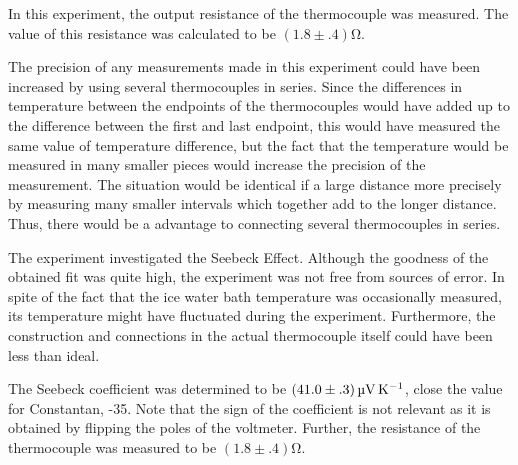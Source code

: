 \begin{paper}
	\columnbreak
	
	In this experiment, the output resistance of the thermocouple was measured.
	The value of this resistance was calculated to be $(1.8\pm.4)\si{\ohm}$.

	The precision of any measurements made in this experiment could have been increased by using several thermocouples in series.
	Since the differences in temperature between the endpoints of the thermocouples would have added up to the difference between the first and last endpoint, this would have measured the same value of temperature difference, but the fact that the temperature would be measured in many smaller pieces would increase the precision of the measurement.
	The situation would be identical if a large distance more precisely by measuring many smaller intervals which together add to the longer distance.
	Thus, there would be a advantage to connecting several thermocouples in series.
	

	The experiment investigated the Seebeck Effect.
	Although the goodness of the obtained fit was quite high, the experiment was not free from sources of error.
	In spite of the fact that the ice water bath temperature was occasionally measured, its temperature might have fluctuated during the experiment.
	Furthermore, the construction and connections in the actual thermocouple itself could have been less than ideal.
	
	The Seebeck coefficient was determined to be \( \left(41.0 \pm .3\right) \si{\micro\volt\per\kelvin} \), close the value for Constantan, -35. Note that the sign of the coefficient is not relevant as it is obtained by flipping the poles of the voltmeter. Further, the resistance of the thermocouple was measured to be $(1.8\pm.4)\si{\ohm}$.



\end{paper}

